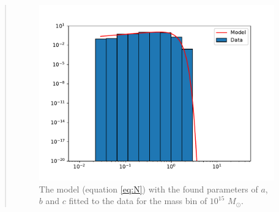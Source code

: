 \begin{quote}
\begin{figure}[!ht]
\centering
\includegraphics[scale=0.7]{plots/satgals_m15.pdf}
\caption{The model (equation \ref{eq:N}) with the found parameters of $a$, $b$ and $c$ fitted to the data for the mass bin of $10^{15}$ $M_{\odot}$.}
\end{figure}
\end{quote}
\newpage


















